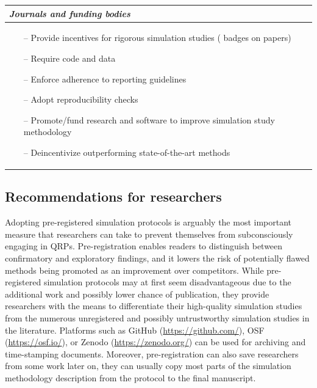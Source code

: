 \documentclass[a4paper, 11pt]{article}
\begin{document}
\begin{table}[!htb]
\begin{tabular}{p{}}
    \textit{Journals and funding bodies} \\
    \midrule
    \vspace{-1.5em}
    \begin{itemize}
    \setlength\itemsep{0pt}
    \setlength\itemindent{-12pt}
    \item[--] Provide incentives for rigorous simulation studies (\eg{} badges on
        papers)
    \item[--] Require code and data
    \item[--] Enforce adherence to reporting guidelines
    \item[--] Adopt reproducibility checks
    \item[--] Promote/fund research and software to improve simulation study methodology
    \item[--] Deincentivize outperforming state-of-the-art methods
    \end{itemize}\\
		\bottomrule
	\end{tabular}
\end{table}

\subsection{Recommendations for researchers}
Adopting pre-registered simulation protocols is arguably the most important measure 
that researchers can take to prevent themselves from subconsciously engaging in QRPs. 
Pre-registration enables readers to distinguish between confirmatory
and exploratory findings, and it lowers the risk of potentially flawed methods
being promoted as an improvement over competitors. While pre-registered
simulation protocols may at 
first seem disadvantageous due to the additional work and possibly lower chance of publication,
they provide researchers with the means to differentiate their high-quality simulation
studies from the numerous unregistered and possibly untrustworthy simulation studies
in the literature. 
Platforms such as GitHub (\url{https://github.com/}), OSF 
(\url{https://osf.io/}), or Zenodo (\url{https://zenodo.org/}) can be used for
archiving and time-stamping documents. Moreover, pre-registration
can also save researchers from some work later on, \eg{} they can usually
copy most parts of the simulation methodology description
from the protocol to the final manuscript.
\end{document}
